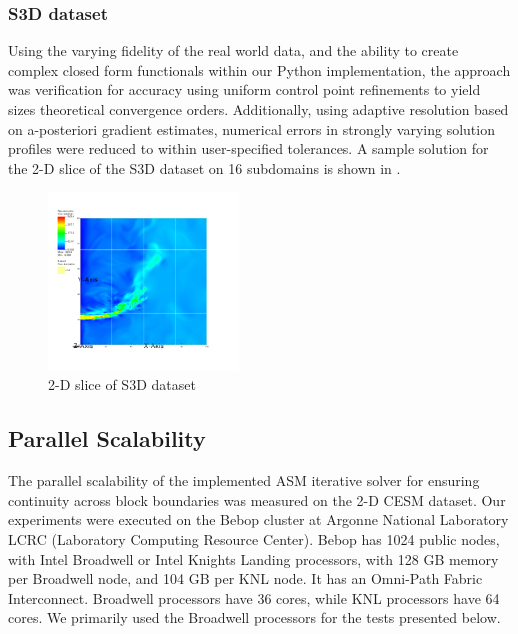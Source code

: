 \subsubsection{S3D dataset}
Using the varying fidelity of the real world data, and the ability to create complex closed form functionals within our Python implementation, the approach was verification for accuracy using uniform control point refinements to yield sizes theoretical convergence orders. Additionally, using adaptive resolution based on a-posteriori gradient estimates, numerical errors in strongly varying solution profiles were reduced to within user-specified tolerances. A sample solution for the 2-D slice of the S3D dataset on 16 subdomains is shown in .

\begin{figure}
	\includegraphics[width=0.45\textwidth]{figures/s3d-2d-profile.png}
	\caption{2-D slice of S3D dataset}
	\label{fig:s3d-adaptive-2d}
\end{figure}





\subsection{Parallel Scalability}\label{sec:parallel-scalability}

The parallel scalability of the implemented ASM iterative solver for ensuring continuity across block boundaries was measured on the 2-D CESM dataset. Our experiments were executed on the Bebop cluster at
Argonne National Laboratory LCRC (Laboratory Computing Resource Center). Bebop has 1024 public nodes, with Intel Broadwell or Intel Knights Landing processors, with 128 GB memory per Broadwell node, and 104 GB per KNL node. It has an Omni-Path Fabric Interconnect. Broadwell processors have 36 cores, while KNL processors have 64 cores. We primarily used the Broadwell processors for the tests presented below.

